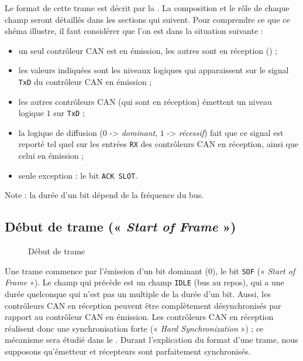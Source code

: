 Le format de cette trame est décrit par la . La composition et le rôle de chaque champ seront détaillés dans les sections qui suivent. Pour comprendre ce que ce shéma illustre, il faut considérer que l'on est dans la situation suivante :
\begin{itemize}
  \item un seul contrôleur CAN est en émission, les autres sont en réception (\pasFini) ;
  \item les valeurs indiquées sont les niveaux logiques qui apparaissent sur le signal \texttt{TxD} du contrôleur CAN en émission ;
  \item les autres contrôleurs CAN (qui sont en réception) émettent un niveau logique $1$ sur \texttt{TxD} ;
  \item la logique de diffusion ($0$ -> \emph{dominant}, $1$ -> \emph{récessif}) fait que ce signal est reporté tel quel sur les entrées \texttt{RX} des contrôleurs CAN en réception, ainsi que celui en émission ;
  \item seule exception : le bit \texttt{ACK SLOT}. 
\end{itemize}

Note : la durée d'un bit dépend de la fréquence du bus.\pasFini









\subsection{Début de trame (« \emph{Start of Frame} »)}

\begin{figure}[ht]
  \centering
  \caption{Début de trame}
\end{figure}

Une trame commence par l'émission d'un bit dominant ($0$), le bit \texttt{SOF} (« \emph{Start of Frame} »). Le champ qui précède est un champ \texttt{IDLE} (bus au repos), qui a une durée quelconque qui n'est pas un multiple de la durée d'un bit. Aussi, les contrôleurs CAN en réception peuvent être complètement désynchronisés par rapport au contrôleur CAN en émission. Les contrôleurs CAN en réception réalisent donc une synchronisation forte (« \emph{Hard Synchronization} ») ; ce mécanisme sera étudié dans le . Durant l'explication du format d'une trame, nous supposons qu'émetteur et récepteurs sont parfaitement synchronisés.











